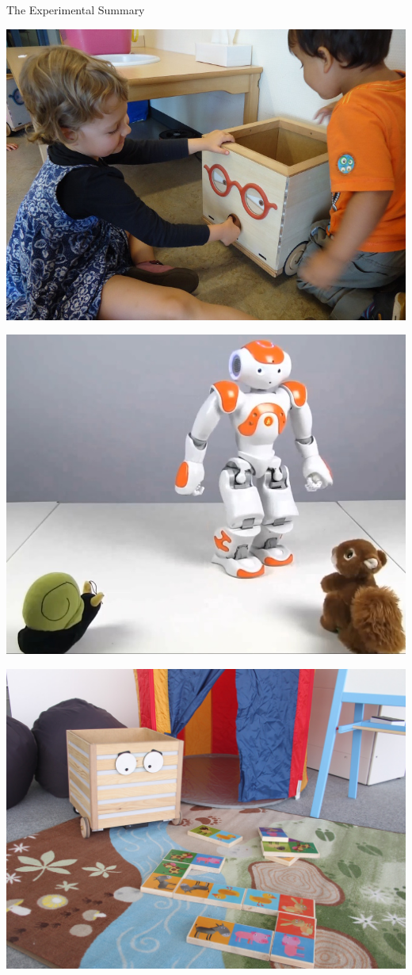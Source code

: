 \documentclass[compress]{beamer}
\begin{document}
{{\begin{frame}{The Experimental Summary}
\begin{multicols}{4}
        \includegraphics[width=\columnwidth]{croquignole-single}

        \includegraphics[width=\columnwidth]{stimulus-toys}

        \includegraphics[width=\columnwidth]{ranger-background}


\end{multicols}
\end{frame}}}
\end{document}
